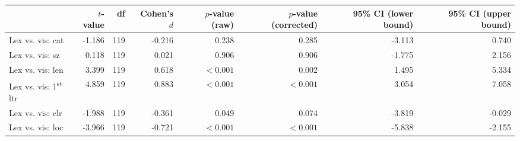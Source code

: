 \begin{tabular}{lrrrrrrr}
\toprule
{} & $t$-value &  df & Cohen's $d$ & $p$-value (raw) & $p$-value (corrected) & 95\% CI (lower bound) & 95\% CI (upper bound) \\
\midrule
Lex vs. vis: cat                       &    -1.186 & 119 &      -0.216 &           0.238 &                 0.285 &                -3.113 &                 0.740 \\
Lex vs. vis: sz                        &     0.118 & 119 &       0.021 &           0.906 &                 0.906 &                -1.775 &                 2.156 \\
Lex vs. vis: len                       &     3.399 & 119 &       0.618 &       $< 0.001$ &                 0.002 &                 1.495 &                 5.334 \\
Lex vs. vis: 1\textsuperscript{st} ltr &     4.859 & 119 &       0.883 &       $< 0.001$ &             $< 0.001$ &                 3.054 &                 7.058 \\
Lex vs. vis: clr                       &    -1.988 & 119 &      -0.361 &           0.049 &                 0.074 &                -3.819 &                -0.029 \\
Lex vs. vis: loc                       &    -3.966 & 119 &      -0.721 &       $< 0.001$ &             $< 0.001$ &                -5.838 &                -2.155 \\
\bottomrule
\end{tabular}
